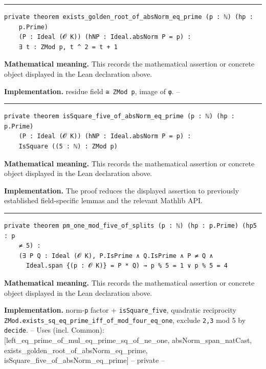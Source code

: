 \documentclass[UTF8,a4paper,11pt,fontset=fandol]{ctexart}
\theoremstyle{definition}
\newcommand{\statementsep}{\par\medskip\hrule\medskip}
\begin{document}
\statementsep
\begin{verbatim}
private theorem exists_golden_root_of_absNorm_eq_prime (p : ℕ) (hp :
    p.Prime)
    (P : Ideal (𝓞 K)) (hNP : Ideal.absNorm P = p) :
    ∃ t : ZMod p, t ^ 2 = t + 1
\end{verbatim}
\noindent\textbf{Mathematical meaning.} This records the mathematical assertion or concrete object displayed in the Lean declaration above.\par
\noindent\textbf{Implementation.} residue field \texttt{≅ ZMod p}, image of \texttt{φ}. --\par
\statementsep
\begin{verbatim}
private theorem isSquare_five_of_absNorm_eq_prime (p : ℕ) (hp : p.Prime)
    (P : Ideal (𝓞 K)) (hNP : Ideal.absNorm P = p) :
    IsSquare ((5 : ℕ) : ZMod p)
\end{verbatim}
\noindent\textbf{Mathematical meaning.} This records the mathematical assertion or concrete object displayed in the Lean declaration above.\par
\noindent\textbf{Implementation.} The proof reduces the displayed assertion to previously established field-specific lemmas and the relevant Mathlib API.\par
\statementsep
\begin{verbatim}
private theorem pm_one_mod_five_of_splits (p : ℕ) (hp : p.Prime) (hp5 : p
    ≠ 5) :
    (∃ P Q : Ideal (𝓞 K), P.IsPrime ∧ Q.IsPrime ∧ P ≠ Q ∧
      Ideal.span {(p : 𝓞 K)} = P * Q) → p % 5 = 1 ∨ p % 5 = 4
\end{verbatim}
\noindent\textbf{Mathematical meaning.} This records the mathematical assertion or concrete object displayed in the Lean declaration above.\par
\noindent\textbf{Implementation.} norm-\texttt{p} factor + \texttt{isSquare\_\allowbreak{}five}, quadratic reciprocity \texttt{ZMod.\allowbreak{}exists\_\allowbreak{}sq\_\allowbreak{}eq\_\allowbreak{}prime\_\allowbreak{}iff\_\allowbreak{}of\_\allowbreak{}mod\_\allowbreak{}four\_\allowbreak{}eq\_\allowbreak{}one}, exclude \texttt{2,3} mod 5 by \texttt{decide}. -- Uses (incl. Common): [left\_\allowbreak{}eq\_\allowbreak{}prime\_\allowbreak{}of\_\allowbreak{}mul\_\allowbreak{}eq\_\allowbreak{}prime\_\allowbreak{}sq\_\allowbreak{}of\_\allowbreak{}ne\_\allowbreak{}one, absNorm\_\allowbreak{}span\_\allowbreak{}natCast, exists\_\allowbreak{}golden\_\allowbreak{}root\_\allowbreak{}of\_\allowbreak{}absNorm\_\allowbreak{}eq\_\allowbreak{}prime, isSquare\_\allowbreak{}five\_\allowbreak{}of\_\allowbreak{}absNorm\_\allowbreak{}eq\_\allowbreak{}prime] -- private --\par
\end{document}
